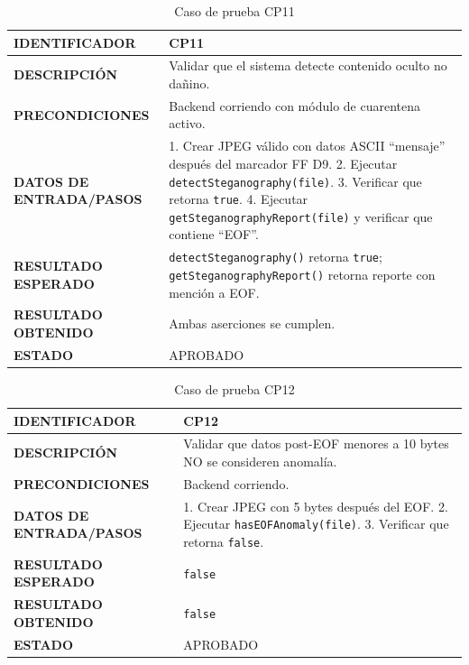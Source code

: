 \begin{table}[H]
\centering
\caption{Caso de prueba CP11}
\begin{tabular}{|p{3.5cm}|p{10.3cm}|}
\hline
\textbf{IDENTIFICADOR} & CP11 \\
\hline
\textbf{DESCRIPCIÓN} & Validar que el sistema detecte contenido oculto no dañino. \\
\hline
\textbf{PRECONDICIONES} & Backend corriendo con módulo de cuarentena activo. \\
\hline
\textbf{DATOS DE ENTRADA/PASOS} & 1. Crear JPEG válido con datos ASCII ``mensaje'' después del marcador FF D9. 2. Ejecutar \texttt{detectSteganography(file)}. 3. Verificar que retorna \texttt{true}. 4. Ejecutar \texttt{getSteganographyReport(file)} y verificar que contiene ``EOF''. \\
\hline
\textbf{RESULTADO ESPERADO} & \texttt{detectSteganography()} retorna \texttt{true}; \texttt{getSteganographyReport()} retorna reporte con mención a EOF. \\
\hline
\textbf{RESULTADO OBTENIDO} & Ambas aserciones se cumplen. \\
\hline
\textbf{ESTADO} & APROBADO \\
\hline
\end{tabular}
\end{table}

\begin{table}[H]
\centering
\caption{Caso de prueba CP12}
\begin{tabular}{|p{3.5cm}|p{10.3cm}|}
\hline
\textbf{IDENTIFICADOR} & CP12 \\
\hline
\textbf{DESCRIPCIÓN} & Validar que datos post-EOF menores a 10 bytes NO se consideren anomalía. \\
\hline
\textbf{PRECONDICIONES} & Backend corriendo. \\
\hline
\textbf{DATOS DE ENTRADA/PASOS} & 1. Crear JPEG con 5 bytes después del EOF. 2. Ejecutar \texttt{hasEOFAnomaly(file)}. 3. Verificar que retorna \texttt{false}. \\
\hline
\textbf{RESULTADO ESPERADO} & \texttt{false} \\
\hline
\textbf{RESULTADO OBTENIDO} & \texttt{false} \\
\hline
\textbf{ESTADO} & APROBADO \\
\hline
\end{tabular}
\end{table}

